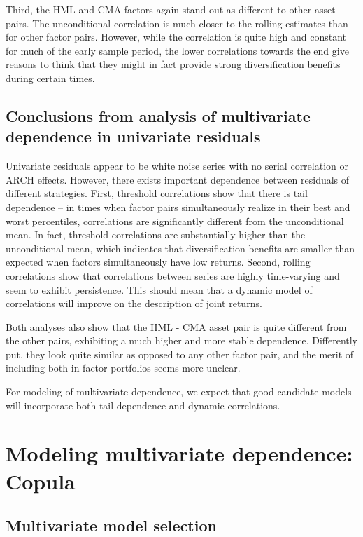Third, the HML and CMA factors again stand out as different to other asset pairs. The unconditional correlation is much closer to the rolling estimates than for other factor pairs. However, while the correlation is quite high and constant for much of the early sample period, the lower correlations towards the end give reasons to think that they might in fact provide strong diversification benefits during certain times.

\subsection{Conclusions from analysis of multivariate dependence in univariate residuals}
Univariate residuals appear to be white noise series with no serial correlation or ARCH effects. However, there exists important dependence between residuals of different strategies. First, threshold correlations show that there is tail dependence -- in times when factor pairs simultaneously realize in their best and worst percentiles, correlations are significantly different from the unconditional mean. In fact, threshold correlations are substantially higher than the unconditional mean, which indicates that diversification benefits are smaller than expected when factors simultaneously have low returns. Second, rolling correlations show that correlations between series are highly time-varying and seem to exhibit persistence. This should mean that a dynamic model of correlations will improve on the description of joint returns.

Both analyses also show that the HML - CMA asset pair is quite different from the other pairs, exhibiting a much higher and more stable dependence. Differently put, they look quite similar as opposed to any other factor pair, and the merit of including both in factor portfolios seems more unclear.

For modeling of multivariate dependence, we expect that good candidate models will incorporate both tail dependence and dynamic correlations.

\section{Modeling multivariate dependence: Copula} %


\subsection{Multivariate model selection}

